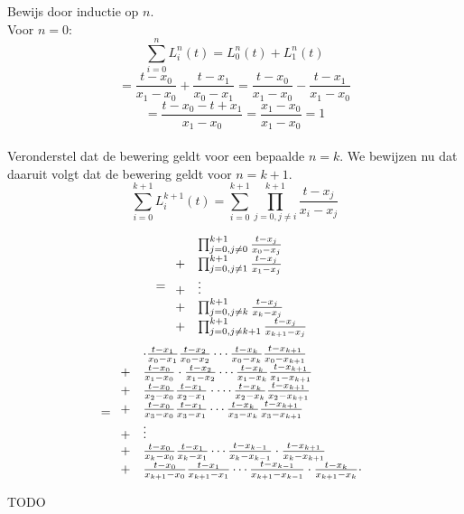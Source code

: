 \documentclass[tmi_notities.tex]{subfiles}
\begin{document}
\begin{enumerate}
Bewijs door inductie op $n$.\\
Voor $n=0$:
\[
\sum_{i=0}^{n}L_i^{n}(t) = L_0^{n}(t) +L_1^{n}(t) 
\]
\[
= \frac{t-x_{0}}{x_{1}-x_{0}} + \frac{t-x_{1}}{x_{0}-x_{1}}
= \frac{t-x_{0}}{x_{1}-x_{0}} - \frac{t-x_{1}}{x_{1}-x_{0}}
\]
\[
= \frac{t-x_{0} - t+x_{1}}{x_{1}-x_{0}} = \frac{x_{1}-x_{0}}{x_{1}-x_{0}} = 1
\]\\
Veronderstel dat de bewering geldt voor een bepaalde $n=k$. We bewijzen nu dat daaruit volgt dat de bewering geldt voor $n=k+1$.\\
\[
\sum_{i=0}^{k+1}L_i^{k+1}(t)
= \sum_{i=0}^{k+1} \prod_{j=0, j \neq i}^{k+1} \frac{t-x_{j}}{x_{i}-x_{j}}
\]

\[
=
\begin{array}{l l}
& \prod_{j=0, j \neq 0}^{k+1} \frac{t-x_{j}}{x_{0}-x_{j}}\\
+ & \prod_{j=0, j \neq 1}^{k+1} \frac{t-x_{j}}{x_{1}-x_{j}}\\
+ & \vdots\\
+ & \prod_{j=0, j \neq k}^{k+1} \frac{t-x_{j}}{x_{k}-x_{j}}\\
+ & \prod_{j=0, j \neq k+1}^{k+1} \frac{t-x_{j}}{x_{k+1}-x_{j}}
\end{array}
\]
\[
=
\begin{array}{l l}
& \cdot \frac{t-x_{1}}{x_{0}-x_{1}} \frac{t-x_{2}}{x_{0}-x_{2}}\cdots \frac{t-x_{k}}{x_{0}-x_{k}} \frac{t-x_{k+1}}{x_{0}-x_{k+1}}\\
+ &  \frac{t-x_{0}}{x_{1}-x_{0}} \cdot\frac{t-x_{2}}{x_{1}-x_{2}}\cdots \frac{t-x_{k}}{x_{1}-x_{k}} \frac{t-x_{k+1}}{x_{1}-x_{k+1}}\\
+ &  \frac{t-x_{0}}{x_{2}-x_{0}} \frac{t-x_{1}}{x_{2}-x_{1}}\cdot \cdots \frac{t-x_{k}}{x_{2}-x_{k}} \frac{t-x_{k+1}}{x_{2}-x_{k+1}}\\
+ &  \frac{t-x_{0}}{x_{3}-x_{0}} \frac{t-x_{1}}{x_{3}-x_{1}} \cdots \frac{t-x_{k}}{x_{3}-x_{k}} \frac{t-x_{k+1}}{x_{3}-x_{k+1}}\\
+ & \vdots\\
+ & \frac{t-x_{0}}{x_{k}-x_{0}} \frac{t-x_{1}}{x_{k}-x_{1}}\cdots \frac{t-x_{k-1}}{x_{k}-x_{k-1}} \cdot \frac{t-x_{k+1}}{x_{k}-x_{k+1}}\\
+ & \frac{t-x_{0}}{x_{k+1}-x_{0}} \frac{t-x_{1}}{x_{k+1}-x_{1}}\cdots \frac{t-x_{k-1}}{x_{k+1}-x_{k-1}} \cdot \frac{t-x_{k}}{x_{k+1}-x_{k}}\cdot
\end{array}
\]
\fi


TODO
\end{enumerate}

\end{document}
